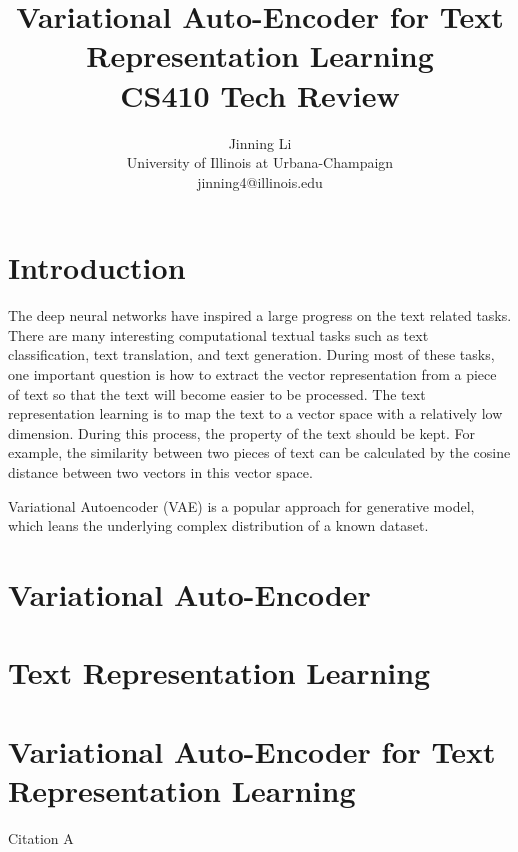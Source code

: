 \documentclass{article}
\title{Variational Auto-Encoder for Text Representation Learning \\\Large{CS410 Tech Review}}
\author{Jinning Li\\
{\small University of Illinois at Urbana-Champaign}\\
{\small jinning4@illinois.edu}}
\begin{document}
\maketitle

\section{Introduction}
The deep neural networks have inspired a large progress on the text related tasks. There are many interesting computational textual tasks such as text classification, text translation, and text generation. During most of these tasks, one important question is how to extract the vector representation from a piece of text so that the text will become easier to be processed. The text representation learning is to map the text to a vector space with a relatively low dimension. During this process, the property of the text should be kept. For example, the similarity between two pieces of text can be calculated by the cosine distance between two vectors in this vector space.

Variational Autoencoder (VAE) is a popular approach for generative model, which leans the underlying complex distribution of a known dataset. 

\section{Variational Auto-Encoder}


\section{Text Representation Learning}

\section{Variational Auto-Encoder for Text Representation Learning}
Citation A ~\cite{10.1007/978-3-030-60029-7_21}





\end{document}
